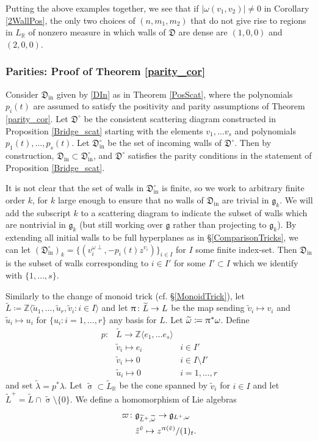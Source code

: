 \documentclass{amsart}
\DeclareMathOperator{\In}{in}
\let\bb=\mathbb
\let\rar=\rightarrow
\let\f=\mathfrak
\let\wt=\widetilde
\renewcommand{\pi}{\uppi\hspace{0.05em}}
\renewcommand{\sigma}{\upsigma}
\theoremstyle{plain}%
\theoremstyle{definition}
\theoremstyle{remark}
\begin{document}
Putting the above examples together, we see that if $\lvert \omega(v_1,v_2)\lvert \neq 0$ in Corollary \ref{2WallPos}, the only two choices of $(n,m_1,m_2)$ that do not give rise to regions in $L_{\bb{R}}$ of nonzero measure in which walls of $\f{D}$ are dense are $(1,0,0)$ and $(2,0,0)$.

\subsubsection{Parities: Proof of Theorem \ref{parity_cor}}\label{parity_proof}
Consider $\f{D}_{\In}$ given by \eqref{DIn} as in Theorem \ref{PosScat}, where the polynomials $p_i(t)$ are assumed to satisfy the positivity and parity assumptions of Theorem \ref{parity_cor}.  
Let $\f{D}^{\circ}$ be the consistent scattering diagram constructed in Proposition \ref{Bridge_scat} starting with the elements $v_1,\ldots v_s$ and polynomials $p_1(t),\ldots,p_s(t)$.  Let $\f{D}^{\circ}_{\In}$ be the set of incoming walls of $\f{D}^{\circ}$.  Then by construction, $\f{D}_{\In}\subset \f{D}^{\circ}_{\In}$, and $\f{D}^{\circ}$ satisfies the parity conditions in the statement of Proposition \ref{Bridge_scat}.

It is not clear that the set of walls in $\f{D}_{\In}^{\circ}$ is finite, so we work to arbitrary finite order $k$, for $k$ large enough to ensure that no walls of $\f{D}_{\In}$ are trivial in $\f{g}_k$.  We will add the subscript $k$ to a scattering diagram to indicate the subset of walls which are nontrivial in $\f{g}_k$ (but still working over $\f{g}$ rather than projecting to $\f{g}_k$).  By extending all initial walls to be full hyperplanes as in \S \ref{ComparisonTricks}, we can let $(\f{D}^{\circ}_{\In})_k=\{(v_i^{\omega\perp},-p_{i}(t)z^{v_{i}})\}_{i\in I}$ for $I$ some finite index-set.  Then $\f{D}_{\In}$ is the subset of walls corresponding to $i\in I'$ for some $I'\subset I$ which we identify with $\{1,\ldots,s\}$.

Similarly to the change of monoid trick (cf. \S \ref{MonoidTrick}), let $\wt{L}\coloneqq \bb{Z}\langle \wt{u}_1,\ldots,\wt{u}_r,\wt{v}_i\colon i\in I\rangle$ and let $\pi\colon \wt{L}\rar L$ be the map sending $\wt{v}_i\mapsto v_i$ and $\wt{u}_i\mapsto u_i$ for $\{u_i\colon i=1,\ldots,r\}$ any basis for $L$. Let $\wt{\omega}\coloneqq \pi^* \omega$.  Define 
\begin{align*}
p\colon &\wt{L}\rightarrow \bb{Z}\langle e_1,\ldots e_s\rangle\\
&\wt{v}_i\mapsto e_i& i\in I'\\
&\wt{v}_i\mapsto 0 &i\in I\setminus I'\\
&\wt{u}_i\mapsto 0&i=1,\ldots,r
\end{align*}
and set $\wt{\lambda}=p^*\lambda$.  Let $\wt{\sigma}\subset \wt{L}_{\bb{R}}$ be the cone spanned by $\wt{v}_i$ for $i\in I$ and let $\wt{L}^+=\wt{L}\cap \wt{\sigma}\setminus\{0\}$.  We define a homomorphism of Lie algebras
\begin{align*}
    \varpi\colon& \f{g}_{\wt{L}^+,\wt{\omega}}\rightarrow \f{g}_{L^+,\omega}\\
    &\hat{z}^{\tilde{v}}\mapsto z^{\pi(\tilde{v})}/(1)_t.
\end{align*}
\end{document}
